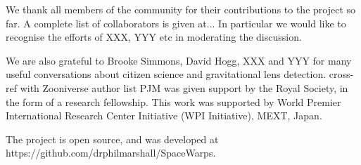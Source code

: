 We thank all \Ncollaboration members of the \sw community for their
contributions to the project so far. A complete list of collaborators is
given at... In particular we would like to recognise the efforts of XXX,
YYY etc in moderating the discussion.

We are also grateful to Brooke Simmons, David Hogg, XXX and YYY for many useful
conversations about citizen science and gravitational lens detection. %
cross-ref with Zooniverse author list
%
PJM was given support by the Royal  Society, in the form of a research
fellowship.  
This work was supported by World Premier International Research
Center Initiative (WPI Initiative), MEXT, Japan.

%
%
%
%
The \sw project is open source, and was developed at
https://github.com/drphilmarshall/SpaceWarps.
